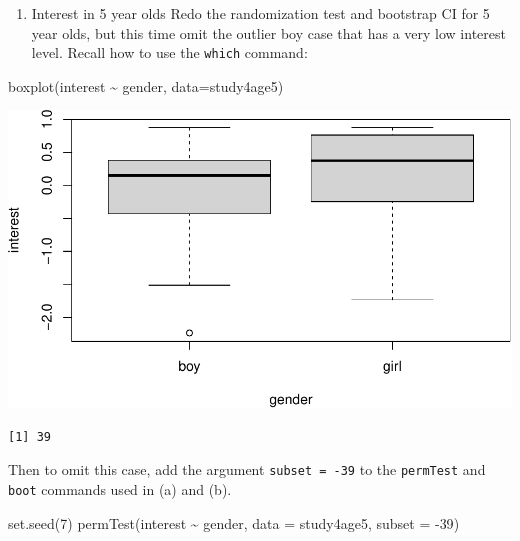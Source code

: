 \documentclass[
]{book}
\newenvironment{Shaded}{\begin{snugshade}}{\end{snugshade}}
\newcommand{\AttributeTok}[1]{\textcolor[rgb]{0.77,0.63,0.00}{#1}}
\newcommand{\DecValTok}[1]{\textcolor[rgb]{0.00,0.00,0.81}{#1}}
\newcommand{\FunctionTok}[1]{\textcolor[rgb]{0.00,0.00,0.00}{#1}}
\newcommand{\NormalTok}[1]{#1}
\newcommand{\SpecialCharTok}[1]{\textcolor[rgb]{0.00,0.00,0.00}{#1}}
\providecommand{\tightlist}{%
  \setlength{\itemsep}{0pt}\setlength{\parskip}{0pt}}
\begin{document}
\begin{enumerate}
\def\labelenumi{(\alph{enumi})}
\setcounter{enumi}{4}
\tightlist
\item
  Interest in 5 year olds
  Redo the randomization test and bootstrap CI for 5 year olds, but this time omit the outlier boy case that has a very low interest level. Recall how to use the \texttt{which} command:
\end{enumerate}

\begin{Shaded}
\begin{Highlighting}[]
\FunctionTok{boxplot}\NormalTok{(interest }\SpecialCharTok{\textasciitilde{}}\NormalTok{ gender, }\AttributeTok{data=}\NormalTok{study4age5)}
\end{Highlighting}
\end{Shaded}

\includegraphics[width=1\linewidth]{Class_Activity_13_files/figure-latex/unnamed-chunk-12-1}

\begin{Shaded}
\end{Shaded}

\begin{verbatim}
[1] 39
\end{verbatim}

Then to omit this case, add the argument \texttt{subset\ =\ -39} to the \texttt{permTest} and \texttt{boot} commands used in (a) and (b).

\begin{Shaded}
\begin{Highlighting}[]
\FunctionTok{set.seed}\NormalTok{(}\DecValTok{7}\NormalTok{)}
\FunctionTok{permTest}\NormalTok{(interest }\SpecialCharTok{\textasciitilde{}}\NormalTok{ gender, }\AttributeTok{data =}\NormalTok{ study4age5, }\AttributeTok{subset =} \SpecialCharTok{{-}}\DecValTok{39}\NormalTok{)}
\end{Highlighting}
\end{Shaded}
\end{document}
